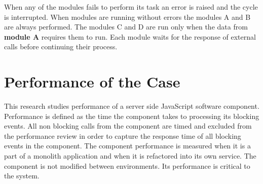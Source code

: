 When any of the modules fails to perform its task an error is raised and the cycle is interrupted.
When modules are running without errors the modules A and B are always performed. 
The modules C and D are run only when the data from \textbf{module A} requires them to run.
Each module waits for the response of external calls before continuing their process.

\section{Performance of the Case}
This research studies performance of a server side JavaScript software component.
Performance is defined as the time the component takes to processing its blocking events.
All non blocking calls from the component are timed and excluded from the performance review in order to capture the response time of all blocking events in the component.
The component performance is measured when it is a part of a monolith application and when it is refactored into its own service.
The component is not modified between environments.
Its performance is critical to the system.
